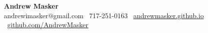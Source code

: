 \begin{center}
    {\Large \textbf{Andrew Masker}}\\
    \vspace{2pt}
    andrewimasker@gmail.com \textbullet\ 717-251-0163 \textbullet\ \href{https://andrewmasker.github.io}{andrewmasker.github.io} \textbullet\ \href{https://github.com/AndrewMasker}{github.com/AndrewMasker}\\
    \hrulefill
\end{center}
